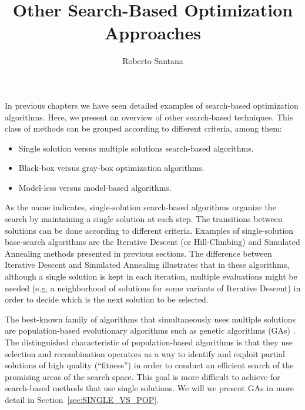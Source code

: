 \title{Other Search-Based Optimization Approaches}
\label{chp:other-search-based-optimization-approaches}
\author{Roberto Santana}
\maketitle


In previous chapters we have seen detailed examples of search-based optimization algorithms. Here, we present an overview of other search-based techniques. This class of methods can be grouped according to different criteria, among them:

 \begin{itemize}
   \item Single solution versus multiple solutions search-based algorithms.
   \item Black-box versus gray-box optimization algorithms.
    \item Model-less versus model-based algorithms.
 \end{itemize}

 As the name indicates, single-solution search-based algorithms organize the search by maintaining a single solution at each step.   The transitions between solutions can be done according to different criteria.  Examples of single-solution base-search algorithms are the Iterative Descent (or Hill-Climbing) and Simulated Annealing methods presented in previous sections. The difference between Iterative Descent  and Simulated Annealing illustrates that in these algorithms, although a single solution is kept in each iteration,  multiple evaluations might be needed (e.g, a neighborhood of solutions for some variants of Iterative Descent) in order to decide which is the next solution to be selected.

 The best-known family of algorithms that simultaneously uses multiple solutions are population-based evolutionary algorithms such as genetic algorithms (GAs) \cite{Goldberg:1989}. The distinguished  characteristic  of population-based algorithms is that they use selection and recombination operators as a way to identify and exploit partial solutions of high quality (``fitness'') in order to conduct an efficient search of the promising areas of the search space. This goal is more difficult to achieve for search-based methods that use single solutions.  We will we present GAs in more detail in Section~\ref{sec:SINGLE_VS_POP}. 


